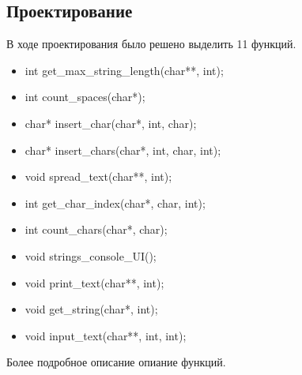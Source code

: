 \documentclass[12pt,a4paper]{report}
\begin{document}
\subsection{Проектирование}
\hspace{\parindent}
В ходе проектирования было решено выделить 11 функций.
\begin{itemize}
\item int get\_max\_string\_length(char**, int);
\item int count\_spaces(char*);
\item char* insert\_char(char*, int, char);
\item char* insert\_chars(char*, int, char, int);
\item void spread\_text(char**, int);
\item int get\_char\_index(char*, char, int);
\item int count\_chars(char*, char);

\item void strings\_console\_UI();
\item void print\_text(char**, int);
\item void get\_string(char*, int);
\item void input\_text(char**, int, int);
\end{itemize}

\hspace{\parindent}
Более подробное описание опиание функций.
\end{document}
